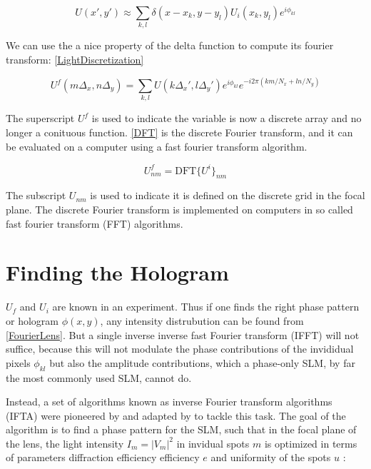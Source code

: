 \begin{equation}\label{LightDiscretization}
    U(x',y') \approx \sum_{k,l} \delta(x-x_k, y-y_l)  U_i(x_k,y_l) e^{i \phi_{kl}}
\end{equation}

We can use the a nice property of the delta function to compute its fourier transform: \cref{LightDiscretization} 

\begin{equation}\label{DFT}
    U^f(m \Delta_x, n \Delta_y) = \sum_{k,l} U(k \Delta_x',l \Delta_y') e^{i \phi_{kl}} e^{-i 2\pi (km/N_x+ln/N_y)}
\end{equation}

The superscript $U^f$ is used to indicate the variable is now a discrete array and no longer a conituous function. \cref{DFT} is the discrete Fourier transform, and it can be evaluated on a computer using a fast fourier transform algorithm. 

\begin{equation}\label{DFTshort}
    U^f_{nm} = \text{DFT}\{U^i\}_{nm}
\end{equation}

The subscript $U_{nm}$ is used to indicate it is defined on the discrete grid in the focal plane. The discrete Fourier transform is implemented on computers in so called fast fourier transform (FFT) algorithms. 



\section{Finding the Hologram}\label{IFTA}

$U_f$ and $U_i$ are known in an experiment. Thus if one finds the right phase pattern or hologram $\phi(x,y)$, any intensity distrubution can be found from \cref{FourierLens}. But a single inverse inverse fast Fourier transform (IFFT) will not suffice, because this will not modulate the phase contributions of the invididual pixels $\phi_{kl}$ but also the amplitude contributions, which a phase-only SLM, by far the most commonly used SLM, cannot do. 

Instead, a set of algorithms known as inverse Fourier transform algorithms (IFTA) were pioneered by \cite{Hirsch1971} and adapted by \cite{Gerschberg1972} to tackle this task. The goal of the algorithm is to find a phase pattern for the SLM, such that in the focal plane of the lens, the light intensity $I_m = |V_m|^2$ in invidual spots $m$ is optimized in terms of parameters diffraction efficiency efficiency $e$ and uniformity of the spots $u$ \cite{DiLeonardo2007}:

